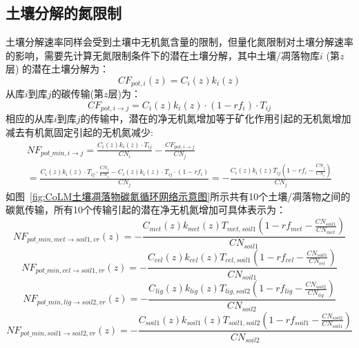 \subsection{土壤分解的氮限制}\label{土壤分解的氮限制}
土壤分解速率同样会受到土壤中无机氮含量的限制，但量化氮限制对土壤分解速率的影响，需要先计算无氮限制条件下的潜在土壤分解，其中土壤/凋落物库$i$ (第$z$层) 的潜在土壤分解为：
\begin{equation}
C F_{pot, i}(z)=C_{i}(z) k_{i}(z)
\end{equation}
从库$i$到库$j$的碳传输(第$z$层)为：
\begin{equation}
C F_{pot, i \rightarrow j}=C_{i}(z) k_{i}(z) \cdot\left(1-r f_{i}\right) \cdot T_{i j}
\end{equation}
相应的从库$i$到库$j$的传输中，潜在的净无机氮增加等于矿化作用引起的无机氮增加减去有机氮固定引起的无机氮减少:
\begin{equation}
\begin{array}{l}NF_{pot\_{min, i \rightarrow j}}=\frac{C_{i}(z) k_{i}(z) \cdot T_{ij}}{C N_{i}}-\frac{C F_{pot, i \rightarrow j}}{C N_{j}} \\
     =\frac{C_{i}(z) k_{i}(z) \cdot T_{i j} \cdot \frac{C N_{j}}{C N_{i}}-C_{i}(z) k_{i}(z) \cdot T_{i j} \cdot\left(1-r f_{i}\right)}{C N_{j}}=
     -\frac{C_{i}(z) k_{i}(z) T_{i j}\left(1-r f_{i}-\frac{C N_{j}}{C N_{i}}\right)}{C N_{j}}\end{array}
\end{equation}
如图~\ref{fig:CoLM土壤凋落物碳氮循环网络示意图}所示共有10个土壤/凋落物之间的碳氮传输，所有10个传输引起的潜在净无机氮增加可具体表示为：
\begin{equation}\label{NF_pot_minmet}
    NF_{{pot}\_{min,met \rightarrow {soil1,vr}}}(z)=-\frac{C_{{met}}(z) k_{{met}}(z) T_{met, soil1}\left(1-r f_{met}-\frac{C N_{{soil1 }}}{C N_{met}}\right)}{C N_{{soil1 }}}
\end{equation}
\begin{equation}
    NF_{pot\_{min,cel \rightarrow {soil1,vr }}}(z)=-\frac{C_{cel}(z) k_{cel}(z) T_{cel, soil1}\left(1-r f_{cel}-\frac{C N_{{soil 1}}}{C N_{cel}}\right)}{C N_{{soil1}}}
\end{equation}
\begin{equation}
    NF_{pot\_{min,lig \rightarrow {soil2,vr}}}(z)=-\frac{C_{lig}(z) k_{lig}(z) T_{lig, soil2}\left(1-r f_{lig}-\frac{C N_{{soil2 }}}{C N_{lig}}\right)}{C N_{{soil2 }}}
\end{equation}
\begin{equation}
    NF_{pot\_{min,soil1\rightarrow {soil2,vr}}}(z)=-\frac{C_{soil1}\left(z\right)k_{soil1}\left(z\right)T_{soil1,soil2}\left(1-rf_{soil1}-\frac{CN_{soil2}}{CN_{soil1}}\right)}{CN_{soil2}}
\end{equation}
